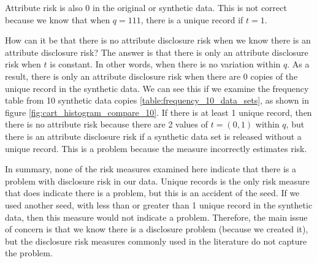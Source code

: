 \documentclass[runningheads]{llncs}
\begin{document}


Attribute risk is also 0 in the original or synthetic data.  This is not correct because we know that when $q=111$, there is a unique record if $t=1$.  

How can it be that there is no attribute disclosure risk when we know there is an attribute disclosure risk?  The answer is that there is only an attribute disclosure risk when $t$ is constant.  In other words, when there is no variation within $q$.  As a result, there is only an attribute disclosure risk when there are 0 copies of the unique record in the synthetic data.  We can see this if we examine the frequency table from 10 synthetic data copies \ref{table:frequency_10_data_sets}, as shown in figure \ref{fig:cart_histogram_compare_10}.  If there is at least 1 unique record, then there is no attribute risk because there are 2 values of $t=(0,1)$ within $q$, but there is an attribute disclosure risk if a synthetic data set is released without a unique record.  This is a problem because the measure incorrectly estimates risk.

In summary, none of the risk measures examined here indicate that there is a problem with disclosure risk in our data.  Unique records is the only risk measure that does indicate there is a problem, but this is an accident of the seed.  If we used another seed, with less than or greater than 1 unique record in the synthetic data, then this measure would not indicate a problem.  Therefore, the main issue of concern is that we know there is a disclosure problem (because we created it), but the disclosure risk measures commonly used in the literature do not capture the problem.  
\end{document}
